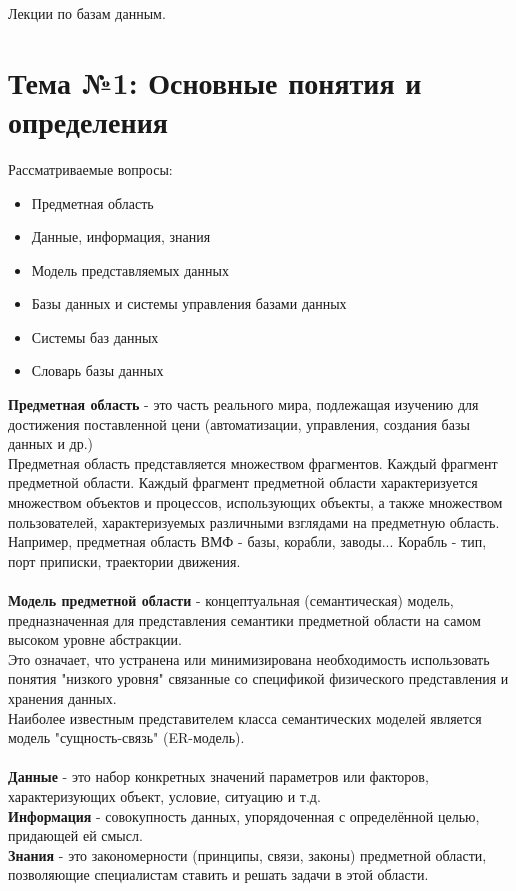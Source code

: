 \documentclass[a4paper]{article}
\begin{document}
\begin{center}
        Лекции по базам данным.
\end{center}
\section*{Тема №1: Основные понятия и определения}
Рассматриваемые вопросы:
\begin{itemize}
        \item Предметная область
	\item Данные, информация, знания
	\item Модель представляемых данных
	\item Базы данных и системы управления базами данных
	\item Системы баз данных
	\item Словарь базы данных
\end{itemize}
\textbf{Предметная область} - это часть реального мира, подлежащая изучению для достижения поставленной цени (автоматизации, управления, создания базы данных и др.)\\
Предметная область представляется множеством фрагментов. Каждый фрагмент предметной области. Каждый фрагмент предметной области характеризуется множеством объектов и процессов, использующих объекты, а также множеством пользователей, характеризуемых различными взглядами на предметную область.\\
Например, предметная область ВМФ - базы, корабли, заводы... Корабль - тип, порт приписки, траектории движения.\\\\
\textbf{Модель предметной области} - концептуальная (семантическая) модель, предназначенная для представления семантики предметной области на самом высоком уровне абстракции.\\
Это означает, что устранена или минимизирована необходимость использовать понятия "низкого уровня" связанные со спецификой физического представления и хранения данных.\\
Наиболее известным представителем класса семантических моделей является модель "сущность-связь" (ER-модель).\\\\
\textbf{Данные} - это набор конкретных значений параметров или факторов, характеризующих объект, условие, ситуацию и т.д.\\
\textbf{Информация} - совокупность данных, упорядоченная с определённой целью, придающей ей смысл.\\
\textbf{Знания} - это закономерности (принципы, связи, законы) предметной области, позволяющие специалистам ставить и решать задачи в этой области.\\ 
\end{document}
